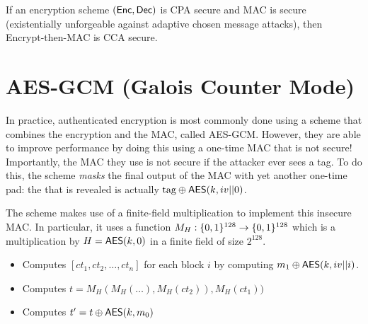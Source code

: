 \begin{theorem}
	If an encryption scheme $(\mathsf{Enc}, \mathsf{Dec})$ is CPA secure and MAC is secure (existentially unforgeable against adaptive chosen message attacks), then Encrypt-then-MAC is CCA secure.	
\end{theorem}

\section{AES-GCM (Galois Counter Mode)}\label{sec:enc:gcm}
In practice, authenticated encryption is most commonly done using a scheme that combines the encryption and the MAC, called AES-GCM. However, they are able to improve performance by doing this using a one-time MAC that is not secure! Importantly, the MAC they use is not secure if the attacker ever sees a tag. To do this, the scheme \emph{masks} the final output of the MAC with yet another one-time pad: the  that is revealed is actually $\text{tag} \oplus \mathsf{AES}(k, iv || 0)$.

The scheme makes use of a finite-field multiplication to implement this insecure MAC. In particular, it uses a function $M_H: \{0,1\}^{128} \rightarrow \{0,1\}^{128}$ which is a multiplication by $H = \mathsf{AES}(k, 0)$ in a finite field of size $2^{128}$.
\begin{itemize}
	\item Computes $[ct_1, ct_2, \ldots, ct_n]$ for each block $i$ by computing $m_1 \oplus \mathsf{AES}(k, iv || i)$.
	\item Computes $t = M_H(M_H(\ldots), M_H(ct_2)), M_H(ct_1))$
	\item Computes $t' = t \oplus \mathsf{AES}(k, m_0)$

\end{itemize}
